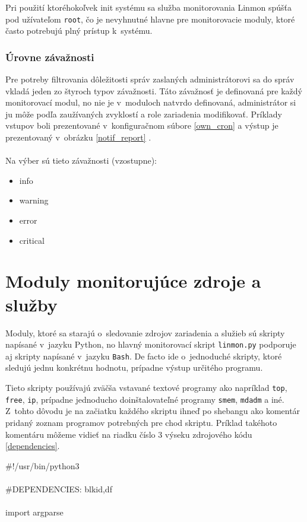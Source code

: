 Pri použití ktoréhokoľvek init systému sa služba monitorovania Linmon spúšťa pod užívateľom \texttt{root}, čo je nevyhnutné hlavne pre monitorovacie moduly, ktoré často potrebujú plný prístup k~systému.

\subsubsection*{Úrovne závažnosti}
\label{importance}

Pre potreby filtrovania dôležitosti správ zaslaných administrátorovi sa do správ vkladá jeden zo štyroch typov závažnosti.  Táto závažnosť je definovaná pre každý monitorovací modul, no nie je v~moduloch natvrdo definovaná, administrátor si ju môže podľa zaužívaných zvyklostí a role zariadenia modifikovať. Príklady vstupov boli prezentované v~konfiguračnom súbore \ref{own_cron} a výstup je prezentovaný v~obrázku \ref{notif_report} .
\noindent
\\
\\
Na výber sú tieto závažnosti (vzostupne):
\begin{itemize}
	\item info
	\item warning
	\item error
	\item critical
\end{itemize}

\section{Moduly monitorujúce zdroje a služby}
\label{monitoring_scripts}
Moduly, ktoré sa starajú o~sledovanie zdrojov zariadenia a služieb sú skripty napísané v~jazyku Python, no hlavný monitorovací skript \texttt{linmon.py} podporuje aj skripty napísané v~jazyku \texttt{Bash}. De facto ide o~jednoduché skripty, ktoré sledujú jednu konkrétnu hodnotu, prípadne výstup určitého programu.

Tieto skripty používajú zväčša vstavané textové programy ako napríklad \texttt{top}, \texttt{free}, \texttt{ip}, prípadne jednoducho doinštalovateľné programy \texttt{smem}, \texttt{mdadm} a iné. Z~tohto dôvodu je na začiatku každého skriptu ihneď po shebangu ako komentár pridaný zoznam programov  potrebných pre chod skriptu. Príklad takéhoto komentáru môžeme vidieť na riadku číslo 3 výseku zdrojového kódu \ref{dependencies}.


\begin{center}
	\begin{algorithm}[H]
		\caption{\label{dependencies}}
		\#!/usr/bin/python3\\
		\ \\
		\#DEPENDENCIES: blkid,df\\
		\ \\
		import argparse\\
	\end{algorithm}
\end{center}

